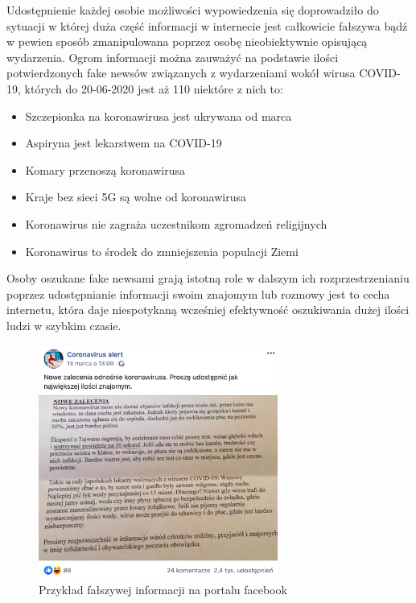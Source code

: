 Udostępnienie każdej osobie możliwości wypowiedzenia się doprowadziło do sytuacji w której duża część informacji w internecie
jest całkowicie fałszywa bądź w pewien sposób zmanipulowana poprzez osobę nieobiektywnie opisującą wydarzenia. Ogrom informacji
można zauważyć na podstawie ilości potwierdzonych fake newsów związanych z wydarzeniami wokół wirusa COVID-19, których do 
20-06-2020 jest aż 110 niektóre z nich to:
\begin{itemize}
    \item Szczepionka na koronawirusa jest ukrywana od marca
    \item Aspiryna jest lekarstwem na COVID-19
    \item Komary przenoszą koronawirusa
    \item Kraje bez sieci 5G są wolne od koronawirusa 
    \item Koronawirus nie zagraża uczestnikom zgromadzeń religijnych
    \item Koronawirus to środek do zmniejszenia populacji Ziemi
\end{itemize}
Osoby oszukane fake newsami grają istotną role w dalszym ich rozprzestrzenianiu poprzez udostępnianie informacji swoim znajomym 
lub rozmowy jest to cecha internetu, która daje niespotykaną wcześniej efektywność oszukiwania dużej ilości ludzi w szybkim
czasie. 
\begin{figure}[h!]
    \centering
    \includegraphics[width=0.7\textwidth]{./Img/cvfakenews.png}
    \caption{Przykład fałszywej informacji na portalu facebook}
\end{figure}

